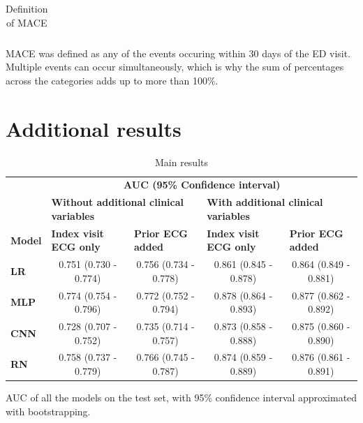 \documentclass[preprint]{elsarticle}
\begin{document}
\begin{table}[H]
\begin{adjustbox}{center}
\begin{tabular}{@{}p{3.1cm}lrr@{}}
\bottomrule
\end{tabular}
\end{adjustbox}
\caption{Definition of MACE}
\medskip
\small
MACE was defined as any of the events occuring within 30 days of the ED visit. Multiple events can occur simultaneously, which is why the sum of percentages across the categories adds up to more than 100\%.
\label{table:appendix:mace}
\end{table}
\renewcommand{\arraystretch}{1}


\section{Additional results}
\label{sec:appendix:results}

\renewcommand{\arraystretch}{1.2}
\begin{table}[H]
  \centering
  \scriptsize
\begin{adjustbox}{center}
\begin{tabular}{@{}lcccc@{}}
  \toprule
  & \multicolumn{4}{c}{\textbf{AUC (95\% Confidence interval)}} \\
  \cmidrule(lr){2-5}
  & \multicolumn{2}{l}{\textbf{Without additional clinical variables}} & \multicolumn{2}{l}{\textbf{With additional clinical variables}} \\
  \cmidrule(lr){2-3}\cmidrule(lr){4-5}
\textbf{Model} & \multicolumn{1}{l}{\textbf{Index visit ECG only}} & \multicolumn{1}{l}{\textbf{Prior ECG added}} & \multicolumn{1}{l}{\textbf{Index visit ECG only}} & \multicolumn{1}{l}{\textbf{Prior ECG added}} \\
  \midrule

\textbf{LR} & 0.751 (0.730 - 0.774) & 0.756 (0.734 - 0.778) & 0.861 (0.845 - 0.878) & 0.864 (0.849 - 0.881) \\
\textbf{MLP} & 0.774 (0.754 - 0.796) & 0.772 (0.752 - 0.794) & 0.878 (0.864 - 0.893) & 0.877 (0.862 - 0.892) \\
\textbf{CNN} & 0.728 (0.707 - 0.752) & 0.735 (0.714 - 0.757) & 0.873 (0.858 - 0.888) & 0.875 (0.860 - 0.890) \\
\textbf{RN} & 0.758 (0.737 - 0.779) & 0.766 (0.745 - 0.787) & 0.874 (0.859 - 0.889) & 0.876 (0.861 - 0.891) \\

\bottomrule
\end{tabular}
\end{adjustbox}
\caption{Main results}
\medskip
\small
AUC of all the models on the test set, with 95\% confidence interval approximated with bootstrapping. 
\label{table:appendix:mainresults}
\end{table}
\renewcommand{\arraystretch}{1}
\end{document}

